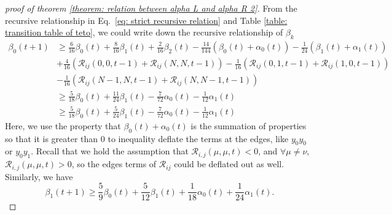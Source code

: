 \documentclass{article}
\begin{document}
\begin{proof}[proof of theorem \ref{theorem: relation between alpha L and alpha R 2}]
   From the recursive relationship in Eq.~\eqref{eq: strict recursive relation} and Table \ref{table: transition table of teto}, we could write down the recursive relationship of $\beta_k$
   \begin{align}
    \beta_0(t+1) & \geq \frac{6}{16} \beta_0(t)+\frac{8}{16} \beta_1(t) + \frac{2}{16}\beta_2(t)-\frac{14}{144}\left(\beta_0(t)+\alpha_0(t)\right)-\frac{1}{24}\left(\beta_1(t)+\alpha_1(t)\right)\nonumber\\
    & + \frac{4}{16}(\mathscr{R}_{i j}(0,0, t-1) + \mathscr{R}_{i j}(N,N, t-1)) -  \frac{1}{16}(\mathscr{R}_{i j}(0,1, t-1) + \mathscr{R}_{i j}(1,0, t-1))\nonumber\\
    &- \frac{1}{16}(\mathscr{R}_{i j}(N-1,N, t-1) + \mathscr{R}_{i j}(N,N-1, t-1))\nonumber\\
    & \geq \frac{5}{18} \beta_0(t)+\frac{11}{24} \beta_1(t)-\frac{7}{72} \alpha_0(t)-\frac{1}{12} \alpha_1(t) \\
    & \geq \frac{5}{18} \beta_0(t)+\frac{5}{24} \beta_1(t)-\frac{7}{72} \alpha_0(t)-\frac{1}{12} \alpha_1(t) 
    \end{align}
    Here, we use the property that $\beta_0(t)+\alpha_0(t)$ is the summation of properties so that it is greater than $0$ to inequality deflate the terms at the edges, like $y_0y_0$ or $ y_0y_1$. Recall that we hold the assumption that $\mathscr{R}_{i, j}(\mu, \mu, t)<0$, and $\forall \mu \neq \nu$, $\mathscr{R}_{i, j}(\mu, \mu, t)>0$, so the edges terms of $\mathscr{R}_{i j}$ could be deflated out as well. Similarly, we have
    \begin{equation}
        \beta_1(t+1)  \geq \frac{5}{9} \beta_0(t)+\frac{5}{12} \beta_1(t)+\frac{1}{18} \alpha_0(t)+\frac{1}{24} \alpha_1(t).
    \end{equation}
    

\end{proof}
\end{document}
